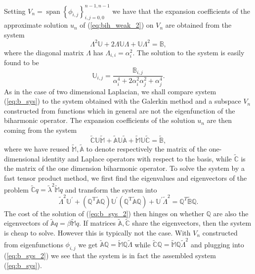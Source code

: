 \documentclass[a4paper,10pt]{article}
\DeclareMathOperator{\spn}{span}
\begin{document}
    Setting $V_n=\spn\left\{\phi_{i, j}\right\}_{i, j = 0, 0}^{n-1, n-1}$ we have
  that the expansion coefficients of the approximate solution $u_n$ of (\ref{eq:bih_weak_2})
  on $V_n$ are obtained from the system
  \begin{equation}
    \label{eq:b_sys}
    \Lambda^2\mathbb{U} + 2\Lambda\mathbb{U}\Lambda + \mathbb{U}\Lambda^2 = \mathbb{B},
  \end{equation}
  where the diagonal matrix $\Lambda$ has $\Lambda_{i, i}=\alpha_i^2$. The
  solution to the system is easily found to be
  \[
    \mathbb{U}_{i, j} = \frac{\mathbb{B}_{i, j}}{\alpha_i^4 +
    2\alpha_i^2\alpha_j^2 + \alpha_j^4}.
  \]
  As in the case of two dimensional Laplacian, we shall compare system
  (\ref{eq:b_sys}) to the system obtained with the Galerkin method and a
  subspace $V_n$ constructed from functions which in general are not the
  eigenfunction of the biharmonic operator. The expansion coefficients of
  the solution $u_n$ are then coming from the system
  \[
    \tilde{\mathbb{C}}\mathbb{U}\tilde{\mathbb{M}} +
    \tilde{\mathbb{A}}\mathbb{U}\tilde{\mathbb{A}} +
    \tilde{\mathbb{M}}\mathbb{U}\tilde{\mathbb{C}} =
    \tilde{\mathbb{B}},
  \]
  where we have reused $\tilde{\mathbb{M}}, \tilde{\mathbb{A}}$ to denote
  respectively the matrix of the one-dimensional identity and Laplace operators
  with respect to the basis, while $\tilde{\mathbb{C}}$ is the matrix of the one
  dimension biharmonic operator. To solve the system by a fast tensor product
  method, we first find the eigenvalues and eigenvectors of the problem 
  $\tilde{\mathbb{C}}q=\tilde{\lambda}^2\tilde{\mathbb{M}}q$ and transform the
  system into 
  \begin{equation}
    \label{eq:b_sys_2}
    \tilde{\Lambda}^2\mathbb{U}^{\prime} +
    \left(\mathbb{Q}^{\text{T}}\tilde{\mathbb{A}}\mathbb{Q}\right)\mathbb{U}^{\prime}
\left(\mathbb{Q}^{\text{T}}\tilde{\mathbb{A}}\mathbb{Q}\right) + 
    \mathbb{U}^{\prime}\tilde{\Lambda}^2 =
    \mathbb{Q}^T\tilde{\mathbb{B}}\mathbb{Q}.
  \end{equation} 
  The cost of the solution of (\ref{eq:b_sys_2}) then hinges on whether
  $\mathbb{Q}$ are also the eigenvectors of
  $\tilde{\mathbb{A}}q=\beta\tilde{\mathbb{M}}q$.
  If matrices $\tilde{\mathbb{A}}, \tilde{\mathbb{C}}$ share the eigenvectors,
  then the system is cheap to solve. However this is typically not the case.
  With $V_n$ constructed from eigenfunctions $\phi_{i, j}$ we get 
  $\tilde{\mathbb{A}}\mathbb{Q}=\tilde{\mathbb{M}}\mathbb{Q}\tilde{\Lambda}$ while
  $\tilde{\mathbb{C}}\mathbb{Q}=\tilde{\mathbb{M}}\mathbb{Q}\tilde{\Lambda}^2$
  and plugging into (\ref{eq:b_sys_2}) we see that the system is in fact the
  assembled system (\ref{eq:b_sys}).
\end{document}
